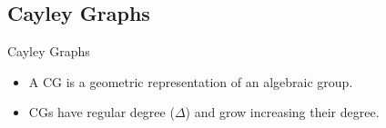 \subsection{Cayley Graphs}
\begin{frame}[t]{Cayley Graphs}
\begin{itemize}
    \item A CG is a geometric representation of an algebraic group.
    \item CGs have regular degree ($\Delta$) and grow increasing their degree.
\end{itemize}
\scriptsize
\begin{table}[]
\end{table}
\end{frame}
